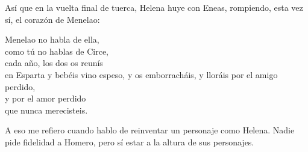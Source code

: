 Así que en la vuelta final de tuerca, Helena huye con Eneas, rompiendo, esta vez sí, el corazón de Menelao:

\begin{versopropio}
Menelao no habla de ella,\\
como tú no hablas de Circe,\\
cada año, los dos os reunís\\
en Esparta y bebéis vino espeso,
\stanzabreak
y os emborracháis, y lloráis por el amigo perdido,\\
y por el amor perdido\\
que nunca merecisteis.
\end{versopropio}

A eso me refiero cuando hablo de reinventar un personaje como Helena. Nadie pide fidelidad a Homero, pero sí estar a la altura de sus personajes.
